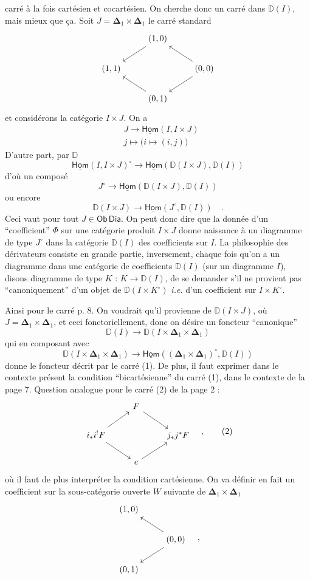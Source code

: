 \documentclass[11pt]{article}
\newcommand{\printedpage}[1]{\marginpar{\footnotesize p.~#1}}
\newcommand{\msp}[1]{\marginpar{\footnotesize [#1]}}
\newcommand{\Dia}{\mathsf{Dia}}
\newcommand{\DD}{\mathbb{D}}
\newcommand{\Hom}{\underline{\mathsf{Hom}}}
\newcommand{\Ob}{\mathsf{Ob}}
\newcommand{\Del}{\boldsymbol{\Delta}}
\begin{document}
carré à la fois cartésien et cocartésien. On cherche donc un carré dans $\DD(I)$, mais mieux que ça. Soit $J = \Del_1 \times \Del_1$ le carré standard
\[
\begin{tikzcd}
& (1,0) \arrow[dl] & \\
(1,1) & & (0,0) \arrow[ul] \arrow[dl] \\
& (0,1) \arrow[ul] &
\end{tikzcd}
\]
et considérons la catégorie $I \times J$. On a
\[
\begin{aligned}
& J \longrightarrow \Hom(I, I \times J) \\
& j \longmapsto \bigl(i \longmapsto (i,j)\bigr)
\end{aligned}
\]
D'autre part, par $\DD$
\[ \Hom(I, I \times J)^{\circ} \longrightarrow \Hom(\DD(I \times J), \DD(I)) \]
d'où un composé
\[ J^{\circ} \longrightarrow \Hom(\DD(I \times J), \DD(I)) \]
ou encore
\[ \DD(I \times J) \longrightarrow \Hom(J^{\circ}, \DD(I)) \quad . \]
Ceci vaut pour tout $J \in \Ob \, \Dia$. On peut donc dire que la donnée d'un “coefficient” $\Phi$ sur une catégorie produit $I \times J$ donne naissance à un diagramme de type $J^{\circ}$ dans la catégorie $\DD(I)$ des coefficients sur $I$. La philosophie
\msp{page 9}
des dérivateurs consiste en grande partie, inversement, chaque fois qu'on a un diagramme dans une catégorie de coefficients $\DD(I)$ (sur un diagramme $I$), disons diagramme de type $K$ : $K \to \DD(I)$, de se demander s'il ne provient pas “canoniquement” d'un objet de $\DD(I \times K^{\circ})$ \textit{i.e.} d'un coefficient sur $I \times K^{\circ}$.

Ainsi pour le carré p. 8. On voudrait qu'il provienne de $\DD(I \times J)$, où $J = \Del_1 \times \Del_1$, et ceci fonctoriellement, donc on désire un foncteur “canonique”
\[ \DD(I) \longrightarrow \DD(I \times \Del_1 \times \Del_1) \]
qui en composant avec
\[ \DD(I \times \Del_1 \times \Del_1) \longrightarrow \Hom((\Del_1 \times \Del_1)^{\circ}, \DD(I)) \]
\printedpage{8}
donne le foncteur décrit par le carré (1). De plus, il faut exprimer dans le contexte présent la condition “bicartésienne” du carré (1), dans le contexte de la page 7. Question analogue pour le carré (2) de la page 2 :
\[
\begin{tikzcd}
& F \arrow[dr] & \\
i_*i^!F \arrow[ur] \arrow[dr] & & j_*j^*F \\
& e \arrow[ur] &
\end{tikzcd}
\quad ,
\tag*{(2)}
\]
où il faut de plus interpréter la condition cartésienne. On va définir en fait un coefficient sur la sous-catégorie ouverte $W$ suivante de $\Del_1 \times \Del_1$
\[
\begin{tikzcd}
(1,0) & \\
& (0,0) \arrow[ul] \arrow[dl] \\
(0,1) &
\end{tikzcd}
\quad ,
\]
\end{document}
